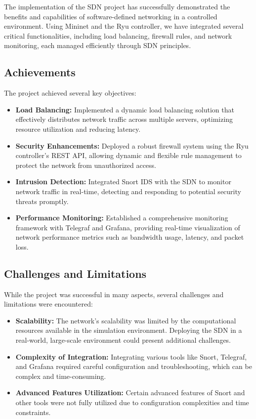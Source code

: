 \documentclass[a4paper,12pt]{article}
\begin{document}
The implementation of the SDN project has successfully demonstrated the benefits and capabilities of software-defined networking in a controlled environment. Using Mininet and the Ryu controller, we have integrated several critical functionalities, including load balancing, firewall rules, and network monitoring, each managed efficiently through SDN principles.

\subsection{Achievements}

The project achieved several key objectives:
\begin{itemize}
    \item \textbf{Load Balancing:} Implemented a dynamic load balancing solution that effectively distributes network traffic across multiple servers, optimizing resource utilization and reducing latency.
    \item \textbf{Security Enhancements:} Deployed a robust firewall system using the Ryu controller's REST API, allowing dynamic and flexible rule management to protect the network from unauthorized access.
    \item \textbf{Intrusion Detection:} Integrated Snort IDS with the SDN to monitor network traffic in real-time, detecting and responding to potential security threats promptly.
    \item \textbf{Performance Monitoring:} Established a comprehensive monitoring framework with Telegraf and Grafana, providing real-time visualization of network performance metrics such as bandwidth usage, latency, and packet loss.
\end{itemize}

\subsection{Challenges and Limitations}

While the project was successful in many aspects, several challenges and limitations were encountered:
\begin{itemize}
    \item \textbf{Scalability:} The network's scalability was limited by the computational resources available in the simulation environment. Deploying the SDN in a real-world, large-scale environment could present additional challenges.
    \item \textbf{Complexity of Integration:} Integrating various tools like Snort, Telegraf, and Grafana required careful configuration and troubleshooting, which can be complex and time-consuming.
    \item \textbf{Advanced Features Utilization:} Certain advanced features of Snort and other tools were not fully utilized due to configuration complexities and time constraints.
\end{itemize}
\end{document}
